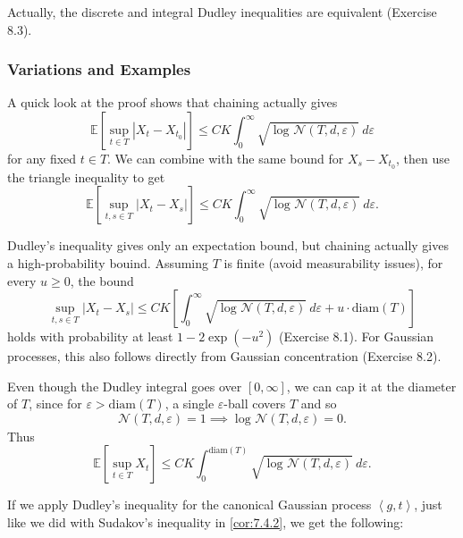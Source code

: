 Actually, the discrete and integral Dudley inequalities are equivalent (Exercise 8.3).


\subsubsection{Variations and Examples}
\begin{remark}
\label{rmk:8.1.5}
A quick look at the proof shows that chaining actually gives 
\[ \mathbb{E}\left[ \sup_{t \in T}|X_t - X_{t_0}| \right] \leq CK 
\int_{0}^{\infty} \sqrt{\log_{}{\mathcal{N}(T, d, \varepsilon)}} \ d \varepsilon \]
for any fixed $t \in T$. We can combine with the same bound for $X_s - X_{t_0}$, then use the triangle 
inequality to get 
\[ \mathbb{E}\left[ \sup_{t, s \in T}|X_t - X_s| \right] \leq CK 
\int_{0}^{\infty} \sqrt{\log_{}{\mathcal{N}(T, d, \varepsilon)}} \ d \varepsilon. \]
\end{remark}

\begin{remark}
\label{rmk:8.1.6}
Dudley's inequality gives only an expectation bound, but chaining actually gives a high-probability bouind. 
Assuming $T$ is finite (avoid measurability issues), for every $u \geq 0$, the bound 
\[ \sup_{t, s \in T} |X_t - X_s| \leq CK \left[ \int_{0}^{\infty} \sqrt{\log_{}{\mathcal{N}(T, d, \varepsilon)}} 
\ d \varepsilon + u \cdot \mathrm{diam}(T) \right] \]
holds with probability at least $1 - 2 \exp{(-u^2)}$ (Exercise 8.1). For Gaussian processes, this also follows 
directly from Gaussian concentration (Exercise 8.2).
\end{remark}

\begin{remark}
\label{rmk:8.1.7}
Even though the Dudley integral goes over $[0, \infty]$, we can cap it at the diameter of $T$, since for 
$\varepsilon > \mathrm{diam}(T)$, a single $\varepsilon$-ball covers $T$ and so 
\[ \mathcal{N}(T, d, \varepsilon) = 1 \implies \log_{}{\mathcal{N}(T, d, \varepsilon)} = 0. \]
Thus 
\[ \mathbb{E}\left[ \sup_{t \in T}X_t \right] \leq CK \int_{0}^{\mathrm{diam}(T)} 
\sqrt{\log_{}{\mathcal{N}(T, d, \varepsilon)}} \ d \varepsilon. \]
\end{remark}

If we apply Dudley's inequality for the canonical Gaussian process $\left\langle g, t \right\rangle$, just 
like we did with Sudakov's inequality in \cref{cor:7.4.2}, we get the following:

